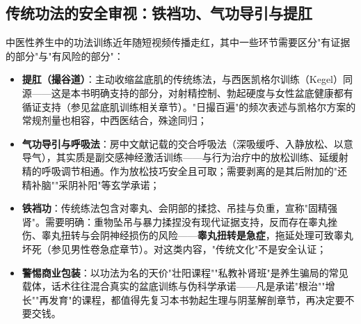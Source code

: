 \subsection{传统功法的安全审视：铁裆功、气功导引与提肛}

中医性养生中的功法训练近年随短视频传播走红，其中一些环节需要区分"有证据的部分"与"有风险的部分"：

\begin{itemize}
\item \textbf{提肛（撮谷道）}：主动收缩盆底肌的传统练法，与西医凯格尔训练（Kegel）同源——这是本书明确支持的部分，对射精控制、勃起硬度与女性盆底健康都有循证支持（参见盆底肌训练相关章节）。"日撮百遍"的频次表述与凯格尔方案的常规剂量也相容，中西医结合，殊途同归；
\item \textbf{气功导引与呼吸法}：房中文献记载的交合呼吸法（深吸缓呼、入静放松、以意导气），其实质是副交感神经激活训练——与行为治疗中的放松训练、延缓射精的呼吸调节相通。作为放松技巧安全且可取；需要剥离的是其后附加的"还精补脑""采阴补阳"等玄学承诺；
\item \textbf{铁裆功}：传统练法包含对睾丸、会阴部的揉捻、吊挂与负重，宣称"固精强肾"。需要明确：重物坠吊与暴力揉捏没有现代证据支持，反而存在睾丸挫伤、睾丸扭转与会阴神经损伤的风险——\textbf{睾丸扭转是急症}，拖延处理可致睾丸坏死（参见男性卷急症章节）。对这类内容，"传统文化"不是安全认证；
\item \textbf{警惕商业包装}：以功法为名的天价"壮阳课程""私教补肾班"是养生骗局的常见载体，话术往往混合真实的盆底训练与伪科学承诺——凡是承诺"根治""增长""再发育"的课程，都值得先复习本书勃起生理与阴茎解剖章节，再决定要不要交钱。
\end{itemize}
